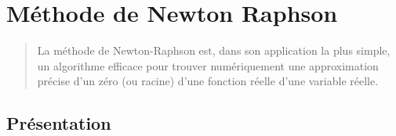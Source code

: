 \chapter{Méthode de Newton Raphson}\label{Ch_NewRaph}
\begin{abstract}
La méthode de Newton-Raphson 
est, dans son application la plus simple, un algorithme efficace 
pour trouver numériquement une approximation précise d'un zéro (ou racine) d'une fonction réelle 
d'une variable réelle. 
\end{abstract}

\medskip
\section{Présentation}


